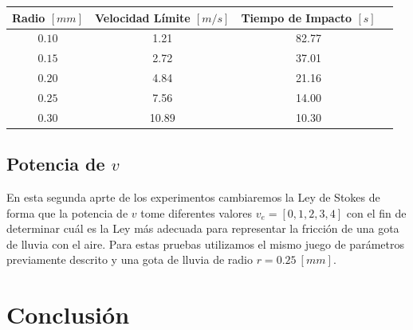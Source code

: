 \documentclass[journal]{IEEEtran}
\begin{document}
\begin{table}[!htb]
	\begin{tabular}{cccc}
		Radio $[mm]$ & Velocidad Límite $[m/s]$ & Tiempo de Impacto $[s]$\\
		\hline
		$0.10$ & 1.21 & 82.77\\
		$0.15$ & 2.72 & 37.01\\
		$0.20$ & 4.84 & 21.16\\
		$0.25$ & 7.56 & 14.00\\
		$0.30$ & 10.89 & 10.30\\
	\end{tabular}
\end{table}

\subsection{Potencia de $v$}

En esta segunda aprte de los experimentos cambiaremos la Ley de Stokes de forma que la potencia de $v$ tome diferentes valores $v_e = [0, 1, 2, 3, 4]$ con el fin de determinar cuál es la Ley más adecuada para representar la fricción de una gota de lluvia con el aire. Para estas pruebas utilizamos el mismo juego de parámetros previamente descrito y una gota de lluvia de radio $r = 0.25~[mm]$.

\section{Conclusión}

\ifCLASSOPTIONcaptionsoff
  \newpage
\fi



%
%
%
\end{document}
